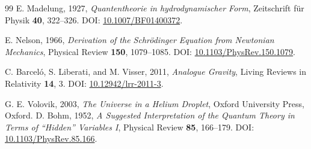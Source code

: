 \documentclass[11pt]{article}
\begin{document}
\begin{thebibliography}{99}
                E. Madelung, 1927,
                \textit{Quantentheorie in hydrodynamischer Form},
                Zeitschrift für Physik \textbf{40}, 322--326.
                DOI: \href{https://doi.org/10.1007/BF01400372}{10.1007/BF01400372}.

                E. Nelson, 1966,
                \textit{Derivation of the Schrödinger Equation from Newtonian Mechanics},
                Physical Review \textbf{150}, 1079--1085.
                DOI: \href{https://doi.org/10.1103/PhysRev.150.1079}{10.1103/PhysRev.150.1079}.

                C. Barceló, S. Liberati, and M. Visser, 2011,
                \textit{Analogue Gravity},
                Living Reviews in Relativity \textbf{14}, 3.
                DOI: \href{https://doi.org/10.12942/lrr-2011-3}{10.12942/lrr-2011-3}.

                G. E. Volovik, 2003,
                \textit{The Universe in a Helium Droplet},
                Oxford University Press, Oxford.
                D. Bohm, 1952,
                \textit{A Suggested Interpretation of the Quantum Theory in Terms of ``Hidden'' Variables I},
                Physical Review \textbf{85}, 166--179.
                DOI: \href{https://doi.org/10.1103/PhysRev.85.166}{10.1103/PhysRev.85.166}.
            
            \end{thebibliography}
\end{document}
